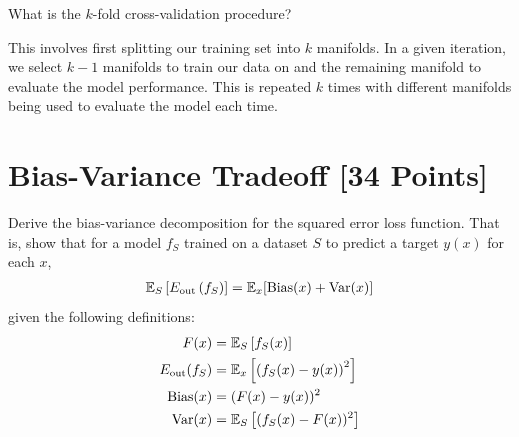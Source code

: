 \begin{problem}[2]
  What is the $k$-fold cross-validation procedure?
\end{problem}
\begin{solution}
  This involves first splitting our training set into $k$ manifolds. In a given iteration, we select $k-1$ manifolds to train our data on and the remaining manifold to evaluate the model performance. This is repeated $k$ times with different manifolds being used to evaluate the model each time. 
\end{solution}




\newpage
\section{Bias-Variance Tradeoff [34 Points]}

\begin{problem}[5]
  Derive the bias-variance decomposition for the squared error loss function. That is, show that for a model $f_S$ trained on a dataset $S$ to predict a target $y(x)$ for each $x$,
  \begin{align*}
    \mathbb{E}_S \left[E_\text{out}\left(f_S\right)\right] = \mathbb{E}_x[\operatorname{Bias}(x) + \operatorname{Var}(x)]
  \end{align*}
  given the following definitions:
  \begin{align*}
    F(x) &= \mathbb{E}_S\left[f_S(x) \right] \\
    E_\text{out}(f_S) &= \mathbb{E}_x\left[\left(f_S(x) - y(x)\right)^2\right] \\
    \operatorname{Bias}(x) &= (F(x) - y(x))^2 \\
    \operatorname{Var}(x) &= \mathbb{E}_S\left[(f_S(x)-F(x))^2\right]
  \end{align*}
\end{problem}

